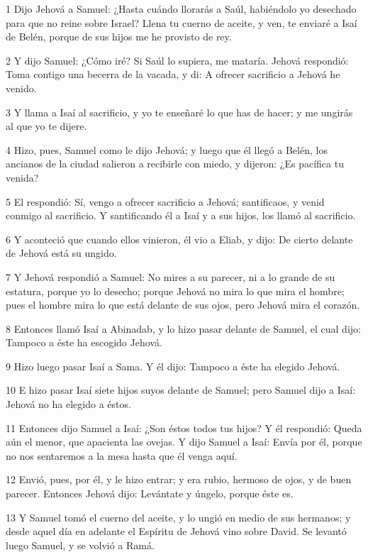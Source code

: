 \par 1 Dijo Jehová a Samuel: ¿Hasta cuándo llorarás a Saúl, habiéndolo yo desechado para que no reine sobre Israel? Llena tu cuerno de aceite, y ven, te enviaré a Isaí de Belén, porque de sus hijos me he provisto de rey.
\par 2 Y dijo Samuel: ¿Cómo iré? Si Saúl lo supiera, me mataría. Jehová respondió: Toma contigo una becerra de la vacada, y di: A ofrecer sacrificio a Jehová he venido.
\par 3 Y llama a Isaí al sacrificio, y yo te enseñaré lo que has de hacer; y me ungirás al que yo te dijere.
\par 4 Hizo, pues, Samuel como le dijo Jehová; y luego que él llegó a Belén, los ancianos de la ciudad salieron a recibirle con miedo, y dijeron: ¿Es pacífica tu venida?
\par 5 El respondió: Sí, vengo a ofrecer sacrificio a Jehová; santificaos, y venid conmigo al sacrificio. Y santificando él a Isaí y a sus hijos, los llamó al sacrificio.
\par 6 Y aconteció que cuando ellos vinieron, él vio a Eliab, y dijo: De cierto delante de Jehová está su ungido.
\par 7 Y Jehová respondió a Samuel: No mires a su parecer, ni a lo grande de su estatura, porque yo lo desecho; porque Jehová no mira lo que mira el hombre; pues el hombre mira lo que está delante de sus ojos, pero Jehová mira el corazón.
\par 8 Entonces llamó Isaí a Abinadab, y lo hizo pasar delante de Samuel, el cual dijo: Tampoco a éste ha escogido Jehová. 
\par 9 Hizo luego pasar Isaí a Sama. Y él dijo: Tampoco a éste ha elegido Jehová.
\par 10 E hizo pasar Isaí siete hijos suyos delante de Samuel; pero Samuel dijo a Isaí: Jehová no ha elegido a éstos.
\par 11 Entonces dijo Samuel a Isaí: ¿Son éstos todos tus hijos? Y él respondió: Queda aún el menor, que apacienta las ovejas. Y dijo Samuel a Isaí: Envía por él, porque no nos sentaremos a la mesa hasta que él venga aquí.
\par 12 Envió, pues, por él, y le hizo entrar; y era rubio, hermoso de ojos, y de buen parecer. Entonces Jehová dijo: Levántate y úngelo, porque éste es.
\par 13 Y Samuel tomó el cuerno del aceite, y lo ungió en medio de sus hermanos; y desde aquel día en adelante el Espíritu de Jehová vino sobre David. Se levantó luego Samuel, y se volvió a Ramá.

